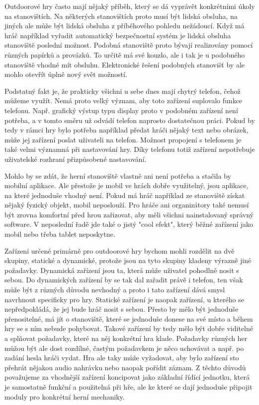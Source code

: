 Outdoorové hry často mají nějaký příběh, který se dá vyprávět konkrétními úkoly na stanovištích.
Na některých stanovištích proto musí být lidská obsluha, na jiných ale může být lidská obsluha z příběhového pohledu nežádoucí.
Když má hráč například vyřadit automatický bezpečnostní systém je lidská obsluha stanoviště poslední možnost.
Podobná stanoviště proto bývají realizovány pomocí různých papírků a provázků.
To určitě má své kouzlo, ale i tak je u podobného stanoviště vhodné mít obsluhu.
Elektronické řešení podobných stanovišť by ale mohlo otevřít úplně nový svět možností.

Podstatný fakt je, že prakticky všichni u sebe dnes mají chytrý telefon, čehož můžeme využít.
Nemá proto velký význam, aby toto zařízení suplovalo funkce telefonu.
Např. grafický výstup typu display proto v podobném zařízení není potřeba, a v tomto směru už odvádí telefon naprosto dostatečnou práci.
Pokud by tedy v rámci hry bylo potřeba například předat hráči nějaký text nebo obrázek, může jej zařízení poslat uživateli na telefon.
Možnost propojení s telefonem je také velmi významná při nastavování hry.
Díky telefonu totiž zařízení nepotřebuje uživatelské rozhraní přizpůsobené nastavování.

Mohlo by se zdát, že herní stanoviště vlastně ani není potřeba a stačila by mobilní aplikace.
Ale přestože je mobil ve hrách dobře využitelný, jsou aplikace, na které jednoduše vhodný není.
Pokud má hráč například ze stanoviště získat nějaký fyzický objekt, mobil neposlouží.
Pro hráče ani organizátory také nemusí být zrovna komfortní před hrou zařizovat, aby měli všichni nainstalovaný správný software.
V neposlední řadě jde také o jistý "cool efekt", který běžné zařízení jako mobil nebo třeba tablet neposkytne. %

Zařízení určené primárně pro outdoorové hry bychom mohli rozdělit na dvě skupiny, statické a dynamické, protože jsou na tyto skupiny kladeny výrazně jiné požadavky.
Dynamická zařízení jsou ta, která může uživatel pohodlně nosit s sebou.
Do dynamických zařízení by se tak dal zařadit právě i telefon, ten však může být z různých důvodu nevhodný a proto i tato zařízení dává smysl navrhnout specificky pro hry.
Statické zařízení je naopak zařízení, u kterého se nepředpokládá, že jej bude hráč nosit s sebou.
Přesto by mělo být jednoduše přenositelné, má jít o stanoviště, které se jednoduše donese na své místo a během hry se s ním nebude pohybovat.
Takové zařízení by tedy mělo být dobře viditelné a splňovat požadavky, které na něj konkrétní hra klade. %
Požadavky různých her můžou být ale dost rozdílné, častým požadavkem je něco uchovávat a např. po zadání hesla hráči vydat.
Hra ale taky může vyžadovat, aby bylo zařízení sto přehrát nějakou audio nahrávku nebo naopak pořídit záznam. %
Z těchto důvodů považujeme za vhodnější zařízení koncipovat jako základní řídící jednotku, která je samostatně funkční a použitelná při hře, ale ke které se dají jednoduše připojit moduly pro konkrétní herní mechaniky.

